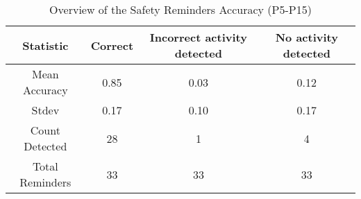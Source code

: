 \begin{table*}
    \centering
    \begin{tabular}{cccc}
        \toprule
        \textbf{Statistic} & \textbf{Correct} & \textbf{Incorrect activity detected} & \textbf{No activity detected} \\
        \midrule
        Mean Accuracy & 0.85 & 0.03 & 0.12 \\
        Stdev & 0.17 & 0.10 & 0.17\\
        Count Detected & 28  & 1 & 4\\ 
        Total Reminders & 33 & 33 & 33\\
        \midrule
        \bottomrule
    \end{tabular}
    \caption{Overview of the Safety Reminders Accuracy (P5-P15)}
    \label{tab:safetyacc}
\end{table*}
